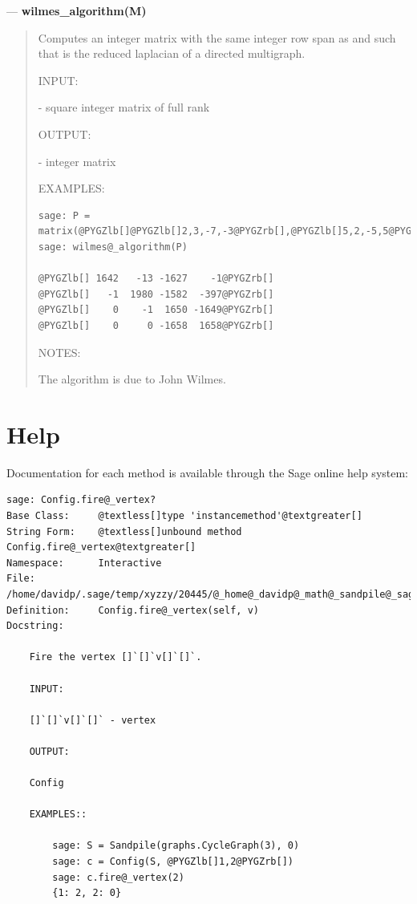 \documentclass[letterpaper,10pt,english]{manual}
\begin{document}
---
\hypertarget{wilmes-algorithm-m}{}
\textbf{wilmes\_algorithm(M)}
\begin{quote}

Computes an integer matrix  with the same integer row span as 
and such that  is the reduced laplacian of a directed multigraph.

INPUT:

 - square integer matrix of full rank

OUTPUT:

 - integer matrix

EXAMPLES:

\begin{Verbatim}[commandchars=@\[\]]
sage: P = matrix(@PYGZlb[]@PYGZlb[]2,3,-7,-3@PYGZrb[],@PYGZlb[]5,2,-5,5@PYGZrb[],@PYGZlb[]8,2,5,4@PYGZrb[],@PYGZlb[]-5,-9,6,6@PYGZrb[]@PYGZrb[])
sage: wilmes@_algorithm(P)

@PYGZlb[] 1642   -13 -1627    -1@PYGZrb[]
@PYGZlb[]   -1  1980 -1582  -397@PYGZrb[]
@PYGZlb[]    0    -1  1650 -1649@PYGZrb[]
@PYGZlb[]    0     0 -1658  1658@PYGZrb[]
\end{Verbatim}

NOTES:

The algorithm is due to John Wilmes.
\end{quote}


\section{Help}

Documentation for each method is available through the Sage online help system:

\begin{Verbatim}[commandchars=@\[\]]
sage: Config.fire@_vertex?
Base Class:     @textless[]type 'instancemethod'@textgreater[]
String Form:    @textless[]unbound method Config.fire@_vertex@textgreater[]
Namespace:      Interactive
File:           /home/davidp/.sage/temp/xyzzy/20445/@_home@_davidp@_math@_sandpile@_sage@_sage@_sandpile2@_0@_sandpile@_sage@_697.py
Definition:     Config.fire@_vertex(self, v)
Docstring:

    Fire the vertex []`[]`v[]`[]`.

    INPUT:

    []`[]`v[]`[]` - vertex

    OUTPUT:

    Config

    EXAMPLES::

        sage: S = Sandpile(graphs.CycleGraph(3), 0)
        sage: c = Config(S, @PYGZlb[]1,2@PYGZrb[])
        sage: c.fire@_vertex(2)
        {1: 2, 2: 0}
\end{Verbatim}
\end{document}
